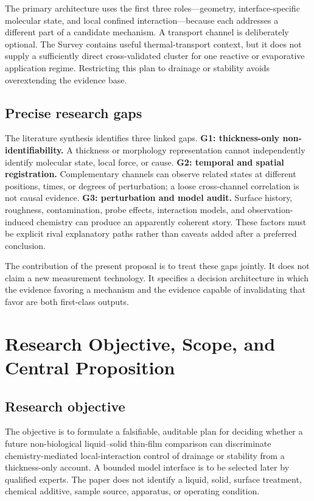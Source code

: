 \documentclass[conference]{IEEEtran}
\begin{document}
The primary architecture uses the first three roles---geometry, interface-specific molecular state, and local confined interaction---because each addresses a different part of a candidate mechanism. A transport channel is deliberately optional. The Survey contains useful thermal-transport context, but it does not supply a sufficiently direct cross-validated cluster for one reactive or evaporative application regime. Restricting this plan to drainage or stability avoids overextending the evidence base.

\subsection{Precise research gaps}

The literature synthesis identifies three linked gaps. \textbf{G1: thickness-only non-identifiability.} A thickness or morphology representation cannot independently identify molecular state, local force, or cause. \textbf{G2: temporal and spatial registration.} Complementary channels can observe related states at different positions, times, or degrees of perturbation; a loose cross-channel correlation is not causal evidence. \textbf{G3: perturbation and model audit.} Surface history, roughness, contamination, probe effects, interaction models, and observation-induced chemistry can produce an apparently coherent story. These factors must be explicit rival explanatory paths rather than caveats added after a preferred conclusion.

The contribution of the present proposal is to treat these gaps jointly. It does not claim a new measurement technology. It specifies a decision architecture in which the evidence favoring a mechanism and the evidence capable of invalidating that favor are both first-class outputs.

\section{Research Objective, Scope, and Central Proposition}

\subsection{Research objective}

The objective is to formulate a falsifiable, auditable plan for deciding whether a future non-biological liquid--solid thin-film comparison can discriminate chemistry-mediated local-interaction control of drainage or stability from a thickness-only account. A bounded model interface is to be selected later by qualified experts. The paper does not identify a liquid, solid, surface treatment, chemical additive, sample source, apparatus, or operating condition.
\end{document}
